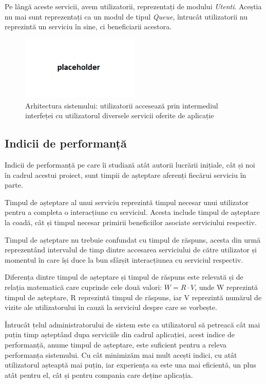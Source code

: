 \documentclass[12pt]{article}
\begin{document}
            Pe lângă aceste servicii, avem utilizatorii, reprezentați de modului \textit{Utenti}. Aceștia nu mai sunt reprezentați ca un modul de tipul \textit{Queue}, întrucât utilizatorii nu reprezintă un serviciu în sine, ci beneficiarii acestora.

            \begin{figure}[h!]
                \centering
                \includegraphics[width=0.5\textwidth]{images/architecture.png}
                \caption{Arhitectura sistemului: utilizatorii accesează prin intermediul interfeței cu utilizatorul diversele servicii oferite de aplicație}
            \end{figure}
            \pagebreak

        \subsection{Indicii de performanță}
            Indicii de performanță pe care îi studiază atât autorii lucrării inițiale, cât și noi în cadrul acestui proiect, sunt timpii de așteptare aferenți fiecărui serviciu în parte.

            Timpul de așteptare al unui serviciu reprezintă timpul necesar unui utilizator pentru a completa o interacțiune cu serviciul. Acesta include timpul de așteptare la coadă, cât și timpul necesar primirii beneficiilor asociate serviciului respectiv.

            Timpul de așteptare nu trebuie confundat cu timpul de răspuns, acesta din urmă reprezentând intervalul de timp dintre accesarea serviciului de către utilizator și momentul în care își duce la bun sfârșit interacțiunea cu serviciul respectiv.

            Diferența dintre timpul de așteptare și timpul de răspuns este relevată și de relația matematică care cuprinde cele două valori: $W=R \cdot V$, unde W reprezintă timpul de așteptare, R reprezintă timpul de răspuns, iar V reprezintă numărul de vizite ale utilizatorului în cauză la serviciul despre care se vorbește.

            Întrucât țelul administratorului de sistem este ca utilizatorul să petreacă cât mai puțin timp așteptând dupa serviciile din cadrul aplicației, acest indice de performanță, anume timpul de așteptare, este suficient pentru a releva performanța sistemului. Cu cât minimizăm mai mult acești indici, cu atât utilizatorul așteaptă mai puțin, iar experiența sa este una mai eficientă, un plus atât pentru el, cât și pentru compania care deține aplicația.
\end{document}
